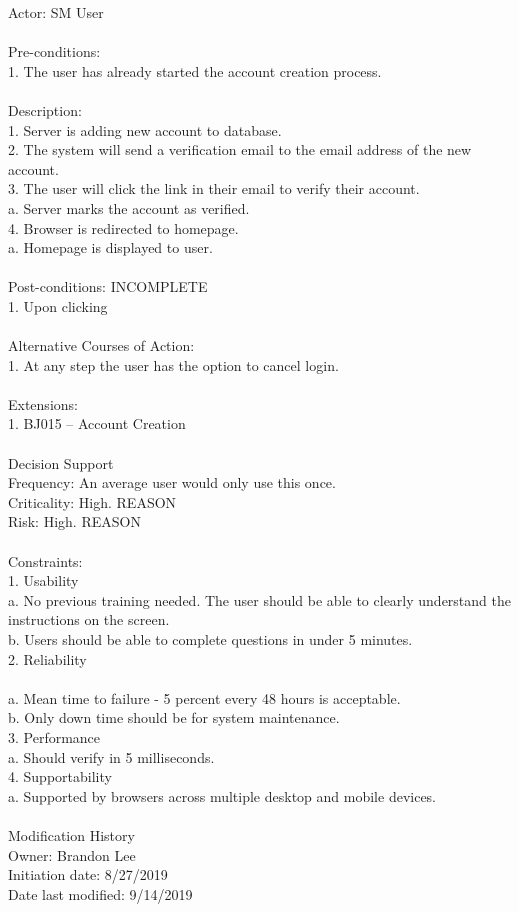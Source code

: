 \documentclass{report}
\begin{document}
Actor: SM User\\
\\
Pre-conditions: \\
1.	The user has already started the account creation process.\\
\\
Description: \\
1.	Server is adding new account to database.\\
2.	The system will send a verification email to the email address of the new account.\\
3.	The user will click the link in their email to verify their account.\\
a.	Server marks the account as verified.\\
4.	Browser is redirected to homepage.\\
a.	Homepage is displayed to user.\\
\\
Post-conditions: INCOMPLETE \\
1.	Upon clicking \\
\\
Alternative Courses of Action:\\
1.	At any step the user has the option to cancel login.\\
\\
Extensions: \\
1.	BJ015 – Account Creation\\
\\
Decision Support\\
     Frequency: An average user would only use this once.\\
     Criticality: High. REASON\\
     Risk: High. REASON\\
\\
Constraints:\\
1.	Usability\\
	a.	No previous training needed. The user should be able to clearly understand the instructions on the screen.\\
	b.	Users should be able to complete questions in under 5 minutes.\\
2.	Reliability\\
\\	a.	Mean time to failure - 5 percent every 48 hours is acceptable.
\\	b.	Only down time should be for system maintenance.\\
3.	Performance\\
	a.	Should verify in 5 milliseconds.\\
4.	Supportability\\
	a.	Supported by browsers across multiple desktop and mobile devices.\\
\\
Modification History\\
     Owner: Brandon Lee\\
     Initiation date: 8/27/2019\\
     Date last modified: 9/14/2019\\
\end{document}
